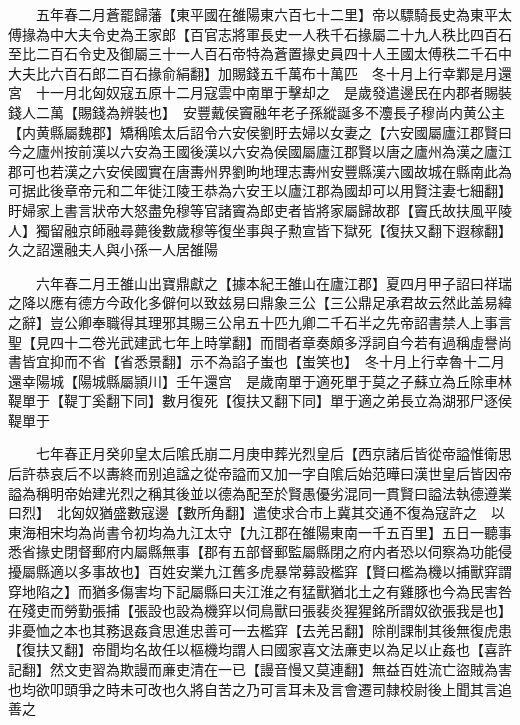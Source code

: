 　　五年春二月蒼罷歸藩【東平國在雒陽東六百七十二里】帝以驃騎長史為東平太傅掾為中大夫令史為王家郎【百官志將軍長史一人秩千石掾屬二十九人秩比四百石至比二百石令史及御屬三十一人百石帝特為蒼置掾史員四十人王國太傅秩二千石中大夫比六百石郎二百石掾俞絹翻】加賜錢五千萬布十萬匹　冬十月上行幸鄴是月還宮　十一月北匈奴寇五原十二月寇雲中南單于擊却之　是歲發遣邊民在内郡者賜裝錢人二萬【賜錢為辨裝也】　安豐戴侯竇融年老子孫縱誕多不灋長子穆尚内黄公主【内黄縣屬魏郡】矯稱隂太后詔令六安侯劉盱去婦以女妻之【六安國屬廬江郡賢曰今之廬州按前漢以六安為王國後漢以六安為侯國屬廬江郡賢以唐之廬州為漢之廬江郡可也若漢之六安侯國實在唐夀州界劉昫地理志夀州安豐縣漢六國故城在縣南此為可据此後章帝元和二年徙江陵王恭為六安王以廬江郡為國却可以用賢注妻七細翻】盱婦家上書言狀帝大怒盡免穆等官諸竇為郎吏者皆將家屬歸故郡【竇氏故扶風平陵人】獨留融京師融尋薨後數歲穆等復坐事與子勲宣皆下獄死【復扶又翻下遐稼翻】久之詔還融夫人與小孫一人居雒陽

　　六年春二月王雒山出寶鼎獻之【據本紀王雒山在廬江郡】夏四月甲子詔曰祥瑞之降以應有德方今政化多僻何以致兹易曰鼎象三公【三公鼎足承君故云然此盖易緯之辭】豈公卿奉職得其理邪其賜三公帛五十匹九卿二千石半之先帝詔書禁人上事言聖【見四十二卷光武建武七年上時掌翻】而間者章奏頗多浮詞自今若有過稱虛譽尚書皆宜抑而不省【省悉景翻】示不為諂子蚩也【蚩笑也】　冬十月上行幸魯十二月還幸陽城【陽城縣屬頴川】壬午還宫　是歲南單于適死單于莫之子蘇立為丘除車林鞮單于【鞮丁奚翻下同】數月復死【復扶又翻下同】單于適之弟長立為湖邪尸逐侯鞮單于

　　七年春正月癸卯皇太后隂氏崩二月庚申葬光烈皇后【西京諸后皆從帝謚惟衛思后許恭哀后不以夀終而别追諡之從帝謚而又加一字自隂后始范曄曰漢世皇后皆因帝謚為稱明帝始建光烈之稱其後並以德為配至於賢愚優劣混同一貫賢曰謚法執德遵業曰烈】　北匈奴猶盛數寇邊【數所角翻】遣使求合市上冀其交通不復為寇許之　以東海相宋均為尚書令初均為九江太守【九江郡在雒陽東南一千五百里】五日一聽事悉省掾史閉督郵府内屬縣無事【郡有五部督郵監屬縣閉之府内者恐以伺察為功能侵擾屬縣適以多事故也】百姓安業九江舊多虎暴常募設檻穽【賢曰檻為機以捕獸穽謂穿地陷之】而猶多傷害均下記屬縣曰夫江淮之有猛獸猶北土之有雞豚也今為民害咎在殘吏而勞勤張捕【張設也設為機穽以伺鳥獸曰張裴炎猩猩銘所謂奴欲張我是也】非憂恤之本也其務退姦貪思進忠善可一去檻穽【去羌呂翻】除削課制其後無復虎患【復扶又翻】帝聞均名故任以樞機均謂人曰國家喜文法亷吏以為足以止姦也【喜許記翻】然文吏習為欺謾而亷吏清在一已【謾音慢又莫連翻】無益百姓流亡盜賊為害也均欲叩頭爭之時未可改也久將自苦之乃可言耳未及言會遷司隸校尉後上聞其言追善之

